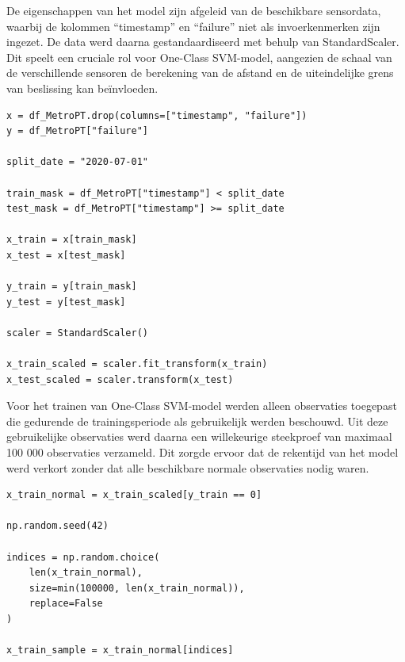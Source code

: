 {{{{{De eigenschappen van het model zijn afgeleid van de beschikbare sensordata, waarbij de kolommen ``timestamp'' en ``failure'' niet als invoerkenmerken zijn ingezet. De data werd daarna gestandaardiseerd met behulp van StandardScaler. Dit speelt een cruciale rol voor One-Class SVM-model, aangezien de schaal van de verschillende sensoren de berekening van de afstand en de uiteindelijke grens van beslissing kan beïnvloeden.

\begin{listing}[H]
\begin{verbatim}
x = df_MetroPT.drop(columns=["timestamp", "failure"])
y = df_MetroPT["failure"]

split_date = "2020-07-01"

train_mask = df_MetroPT["timestamp"] < split_date
test_mask = df_MetroPT["timestamp"] >= split_date

x_train = x[train_mask]
x_test = x[test_mask]

y_train = y[train_mask]
y_test = y[test_mask]

scaler = StandardScaler()
 
x_train_scaled = scaler.fit_transform(x_train)
x_test_scaled = scaler.transform(x_test)
\end{verbatim}
\caption[Code snippet: het voorbereiden en standaardiseren van MetroPT-3-data voor het One-Class SVM-model.]{Codefragment van het voorbereiden en standaardiseren van de MetroPT-3-data voor het One-Class SVM-model.}
\end{listing}

Voor het trainen van One-Class SVM-model werden alleen observaties toegepast die gedurende de trainingsperiode als gebruikelijk werden beschouwd. Uit deze gebruikelijke observaties werd daarna een willekeurige steekproef van maximaal 100 000 observaties verzameld. Dit zorgde ervoor dat de rekentijd van het model werd verkort zonder dat alle beschikbare normale observaties nodig waren.
    
\begin{listing}[H]
\begin{verbatim}
x_train_normal = x_train_scaled[y_train == 0]

np.random.seed(42)

indices = np.random.choice(
    len(x_train_normal),
    size=min(100000, len(x_train_normal)),
    replace=False
)

x_train_sample = x_train_normal[indices]
\end{verbatim}
\caption[Code snippet: het selecteren van normale trainingsobservaties voor het One-Class SVM-model.]{Codefragment van het selecteren van normale trainingsobservaties voor het One-Class SVM-model.}
\end{listing}    
    
}}}}}
